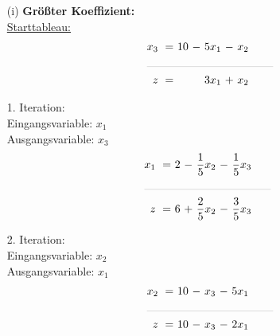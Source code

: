\documentclass [a4paper,11pt]{article}
\begin{document}
\begin{enumerate}
\begin{enumerate}
\begin{enumerate}
                    \item[(i)]
                        \textbf{Größter Koeffizient:}\\
                        \underline{Starttableau:}
                        \begin{align*}
                        \begin{alignedat}{6}
                        && x_3 &\ = &\ 10 &\ - &\ 5x_1 &\ - &\  x_2 \\
                        &\rlap{\rule{4cm}{.1pt}} &&&&&&&\\
                        && z   &\ = &\    &    &\ 3x_1 &\ + &\  x_2
                        \end{alignedat}
                        \end{align*}

                        1. Iteration:\\
                        Eingangsvariable: $x_1$\\
                        Ausgangsvariable: $x_3$
                        \begin{align*}
                        \begin{alignedat}{6}
                        && x_1 &\ = &\  2 &\ - &\ \frac{1}{5}x_2 &\ - &\ \frac{1}{5}x_3 \\
                        &\rlap{\rule{4cm}{.1pt}} &&&&&&&\\
                        && z   &\ = &\  6 &\ + &\ \frac{2}{5}x_2 &\ - &\ \frac{3}{5}x_3
                        \end{alignedat}
                        \end{align*}

                        2. Iteration:\\
                        Eingangsvariable: $x_2$\\
                        Ausgangsvariable: $x_1$
                        \begin{align*}
                        \begin{alignedat}{6}
                        && x_2 &\ = &\ 10 &\ - &\ x_3 &\ - &\ 5x_1 \\
                        &\rlap{\rule{4cm}{.1pt}} &&&&&&&\\
                        && z   &\ = &\ 10 &\ - &\ x_3 &\ - &\ 2x_1
                        \end{alignedat}
                        \end{align*}


\end{enumerate}
\end{enumerate}
\end{enumerate}
\end{document}
